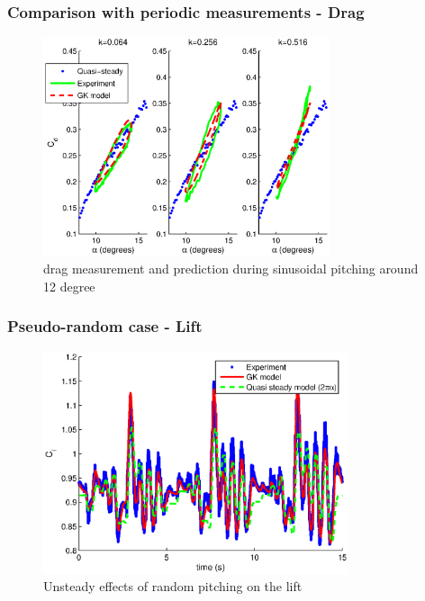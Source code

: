 \documentclass[compress]{beamer}
\begin{document}
\begin{frame}
  \frametitle{Comparison with periodic measurements - Drag}

  \begin{figure}[h]
    \begin{center}
      \includegraphics[width=0.75\textwidth]{./Figures/Pitching_allcases_GK_CD_12_amp_2.eps}
    \end{center}
    \caption{drag measurement and prediction during sinusoidal pitching around 12 degree} 
  \end{figure}
\end{frame}

\begin{frame}
  \frametitle{Pseudo-random case - Lift}
  \begin{figure}[h]
    \begin{center}
      \includegraphics[width=0.8\textwidth]{./Figures/Cl_u=3_meanaoa=12(15seconds)_amp=2_freq=2p0.eps}
    \end{center}
    \caption{Unsteady effects of random pitching on the lift}
  \end{figure}
\end{frame}
\end{document}
